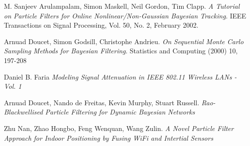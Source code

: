 \documentclass[12pt, a4paper]{article}
\begin{document}
\begin{thebibliography}{9}
M. Sanjeev Arulampalam, Simon Maskell, Neil Gordon, Tim Clapp.
\textit{A Tutorial on Particle Filters for Online Nonlinear/Non-Gaussian Bayesian Tracking}. 
IEEE Transactions on Signal Processing, Vol. 50, No. 2, February 2002.
 
Arnuad Doucet, Simon Godsill, Christophe Andrieu.
\textit{On Sequential Monte Carlo Sampling Methods for Bayesian Filtering}. 
Statistics and Computing (2000) 10, 197-208

Daniel B. Faria
\textit{Modeling Signal Attenuation in IEEE 802.11 Wireless LANs - Vol. 1}

Arnuad Doucet, Nando de Freitas, Kevin Murphy, Stuart Russell.
\textit{Rao-Blackwellised Particle Filtering for Dynamic Bayesian Networks}

Zhu Nan, Zhao Hongbo, Feng Wenquan, Wang Zulin.
\textit{A Novel Particle Filter Approach for Indoor Positioning by Fusing WiFi and Intertial Sensors}
\end{thebibliography}
\end{document}
